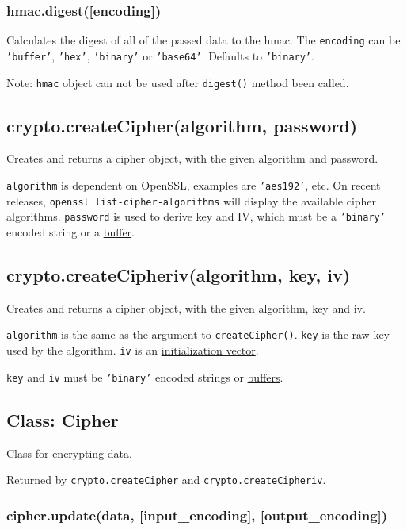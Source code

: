 \subsubsection{hmac.digest({[}encoding{]})}

Calculates the digest of all of the passed data to the hmac. The
\texttt{encoding} can be \texttt{'buffer'}, \texttt{'hex'},
\texttt{'binary'} or \texttt{'base64'}. Defaults to \texttt{'binary'}.

Note: \texttt{hmac} object can not be used after \texttt{digest()}
method been called.

\subsection{crypto.createCipher(algorithm, password)}

Creates and returns a cipher object, with the given algorithm and
password.

\texttt{algorithm} is dependent on OpenSSL, examples are
\texttt{'aes192'}, etc. On recent releases,
\texttt{openssl list-cipher-algorithms} will display the available
cipher algorithms. \texttt{password} is used to derive key and IV, which
must be a \texttt{'binary'} encoded string or a
\href{buffer.html}{buffer}.

\subsection{crypto.createCipheriv(algorithm, key, iv)}

Creates and returns a cipher object, with the given algorithm, key and
iv.

\texttt{algorithm} is the same as the argument to
\texttt{createCipher()}. \texttt{key} is the raw key used by the
algorithm. \texttt{iv} is an
\href{http://en.wikipedia.org/wiki/Initialization\_vector}{initialization
vector}.

\texttt{key} and \texttt{iv} must be \texttt{'binary'} encoded strings
or \href{buffer.html}{buffers}.

\subsection{Class: Cipher}

Class for encrypting data.

Returned by \texttt{crypto.createCipher} and
\texttt{crypto.createCipheriv}.

\subsubsection{cipher.update(data, {[}input\_encoding{]},
{[}output\_encoding{]})}

